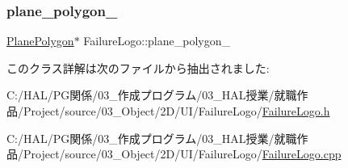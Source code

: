 \subsubsection{\texorpdfstring{plane\+\_\+polygon\+\_\+}{plane\_polygon\_}}
{\footnotesize\ttfamily \mbox{\hyperlink{class_plane_polygon}{Plane\+Polygon}}$\ast$ Failure\+Logo\+::plane\+\_\+polygon\+\_\+}



このクラス詳解は次のファイルから抽出されました\+:\begin{DoxyCompactItemize}
\item 
C\+:/\+H\+A\+L/\+P\+G関係/03\+\_\+作成プログラム/03\+\_\+\+H\+A\+L授業/就職作品/\+Project/source/03\+\_\+\+Object/2\+D/\+U\+I/\+Failure\+Logo/\mbox{\hyperlink{_failure_logo_8h}{Failure\+Logo.\+h}}\item 
C\+:/\+H\+A\+L/\+P\+G関係/03\+\_\+作成プログラム/03\+\_\+\+H\+A\+L授業/就職作品/\+Project/source/03\+\_\+\+Object/2\+D/\+U\+I/\+Failure\+Logo/\mbox{\hyperlink{_failure_logo_8cpp}{Failure\+Logo.\+cpp}}\end{DoxyCompactItemize}
